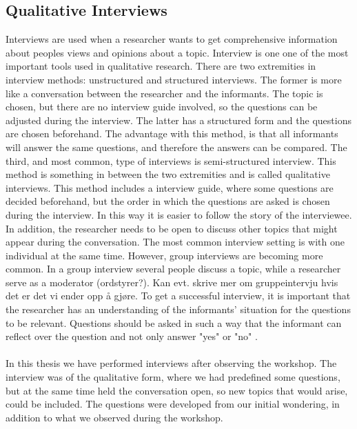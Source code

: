 \subsection{Qualitative Interviews}
Interviews are used when a researcher wants to get comprehensive information about peoples views and opinions about a topic. Interview is one one of the most important tools used in qualitative research. There are two extremities in interview methods: unstructured and structured interviews. The former is more like a conversation between the researcher and the informants. The topic is chosen, but there are no interview guide involved, so the questions can be adjusted during the interview. The latter has a structured form and the questions are chosen beforehand. The advantage with this method, is that all informants will answer the same questions, and therefore the answers can be compared. The third, and most common, type of interviews is semi-structured interview. This method is something in between the two extremities and is called qualitative interviews. This method includes a interview guide, where some questions are decided beforehand, but the order in which the questions are asked is chosen during the interview. In this way it is easier to follow the story of the interviewee. In addition, the researcher needs to be open to discuss other topics that might appear during the conversation. The most common interview setting is with one individual at the same time. However, group interviews are becoming more common. In a group interview several people discuss a topic, while a researcher serve as a moderator (ordstyrer?). Kan evt. skrive mer om gruppeintervju hvis det er det vi ender opp å gjøre. To get a successful interview, it is important that the researcher has an understanding of the informants’ situation for the questions to be relevant. Questions should be asked in such a way that the informant can reflect over the question and not only answer "yes" or "no" \cite{qualitative}. \\ \\
In this thesis we have performed interviews after observing the workshop. The interview was of the qualitative form, where we had predefined some questions, but at the same time held the conversation open, so new topics that would arise, could be included. The questions were developed from our initial wondering, in addition to what we observed during the workshop. 
